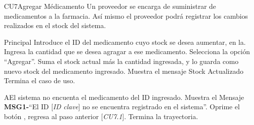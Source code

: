 
% 



	\begin{UseCase}{CU7}{Agregar Médicamento}{
		Un proveedor se encarga de suministrar de medicamentos a la farmacia. Así mismo el proveedor podrá registrar los cambios realizados en el stock del sistema.
	}
	\end{UseCase}

	\begin{UCtrayectoria}{Principal}
		\UCpaso[\UCactor] Introduce el ID del medicamento cuyo stock se desea aumentar, en la\label{CU7IntroduceMedicamentos}.
		\UCpaso[\UCactor]Ingresa la cantidad que se desea agragar a ese medicamento. 
		\UCpaso[\UCactor] Selecciona la opción ``Agregar''. 
		\UCpaso Suma el stock actual más la cantidad ingresada, y lo guarda como nuevo stock del medicamento ingresado.
		\UCpaso Muestra el mensaje Stock Actualizado
		\UCpaso[] Termina el caso de uso.
	\end{UCtrayectoria}
		
		\begin{UCtrayectoriaA}{A}{El sistema no encuenta el medicamento del ID ingresado.}
			\UCpaso Muestra el Mensaje {\bf MSG1-}``El ID [{\em ID clave}] no se encuentra registrado en el sistema''.
			\UCpaso[\UCactor] Oprime el botón , regresa al paso anterior [{\em CU7.1}].  
			\UCpaso[] Termina la trayectoria.
		\end{UCtrayectoriaA}
		
		
	
		
